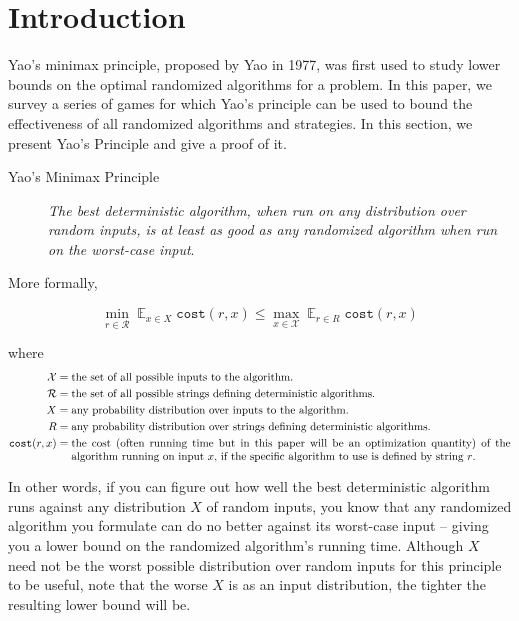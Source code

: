 \newcommand{\Expected}{\mathop{\mathds{E}}}

\section{Introduction}

Yao's minimax principle, proposed by Yao in 1977, was first used to study lower bounds on the optimal randomized algorithms for a problem. In this paper, we survey a series of games for which Yao's principle can be used to bound the effectiveness of all randomized algorithms and strategies.
In this section, we present Yao's Principle and give a proof of it.


\begin{description}
	\item[Yao's Minimax Principle] \emph{The best deterministic algorithm, when run on any distribution over random inputs, is at least as good as any randomized algorithm when run on the worst-case input}.
\end{description}
More formally,

$$\min_{r \in \mathcal{R}} \Expected_{x \in X} \texttt{cost}(r, x) \leq \max_{x \in \mathcal{X}} \Expected_{r \in R} \texttt{cost}(r, x)$$

where \begin{align*}
\mathcal{X} =&\; \text{the set of all possible inputs to the algorithm.}
\\
\mathcal{R} =&\; \text{the set of all possible strings defining deterministic algorithms.}
\\
X =&\; \text{any probability distribution over inputs to the algorithm.}
\\
R =&\; \text{any probability distribution over strings defining deterministic algorithms.}
\\
\texttt{cost}(r, x) =&\; \text{\parbox[t]{5.5in}{the cost (often running time but in this paper will be an optimization quantity) of the algorithm running on input $x$, if the specific algorithm to use is defined by string $r$.}}
\end{align*}

In other words, if you can figure out how well the best deterministic algorithm runs against any distribution $X$ of random inputs, you know that any randomized algorithm you formulate can do no better against its worst-case input -- giving you a lower bound on the randomized algorithm's running time.
Although $X$ need not be the worst possible distribution over random inputs for this principle to be useful, note that the worse $X$ is as an input distribution, the tighter the resulting lower bound will be. 

